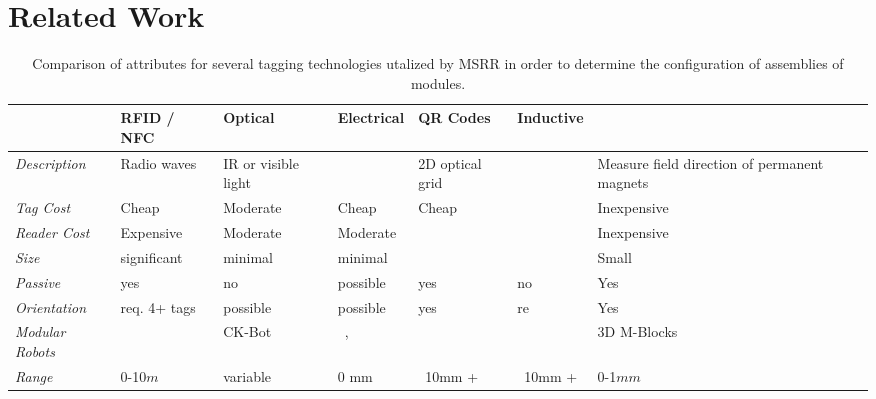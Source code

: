 
\section{Related Work}
\label{sec:RelatedWork}

\begin{table*}[t]
	\centering
	\caption{Comparison of attributes for several tagging technologies utalized by MSRR in order to determine the configuration of assemblies of modules.}
	\newcommand{\wdd}{2.05cm}
	\begin{tabular}{ p{1.7 cm} p{\wdd}  p{\wdd} p{\wdd} p{\wdd} p{\wdd} p{\wdd} p{\wdd}  }
		\hline
		\addlinespace[1ex]
		& RFID / NFC		& Optical				& Electrical 		& QR Codes 			& Inductive			& \bf{\tagNamePlural} \\ %
		\hline
		
		\textit{Description}				& Radio waves		& IR or visible light	& 					& 2D optical grid	&					& Measure field direction of permanent magnets \\
		
		\addlinespace[1ex]	\textit{Tag Cost}		& Cheap				& Moderate				& Cheap				& Cheap	 			&					& Inexpensive \\
		
		\addlinespace[1ex]	\textit{Reader Cost}	& Expensive			& Moderate				& Moderate			& 	 				&					& Inexpensive \\
		
		\addlinespace[1ex] 	\textit{Size} 			& significant 		& minimal 				& minimal	  		&       			&					& Small		  \\
		
		\addlinespace[1ex]	\textit{Passive} 		& yes				& no					& possible	 		& yes				& no				& Yes		  \\
		
		\addlinespace[1ex] 	\textit{Orientation} 	& req. 4+ tags 		& possible 				& possible	 		& yes				& re				& Yes		\\
		
		\addlinespace[1ex] 	\textit{Modular Robots}	& ~\	%
		& CK-Bot~\cite{park2008automatic}					%
		& ~\cite{Soldercubes2016}, ~\cite{ubot-Zhu-2014}	%
		& 													%
		& ~\cite{TosunDaveyLiuYim-IROS2016}					%
		& 3D M-Blocks~\cite{Romanishin20153d}	\\ 			%
		
		\addlinespace[1ex] 	\textit{Range}			& 0-10$m$			& variable				& 0 mm				& ~10mm +			& ~10mm +			& 0-1$mm$	\\
	\end{tabular}
	\label{tab:tagTech}
\end{table*}

